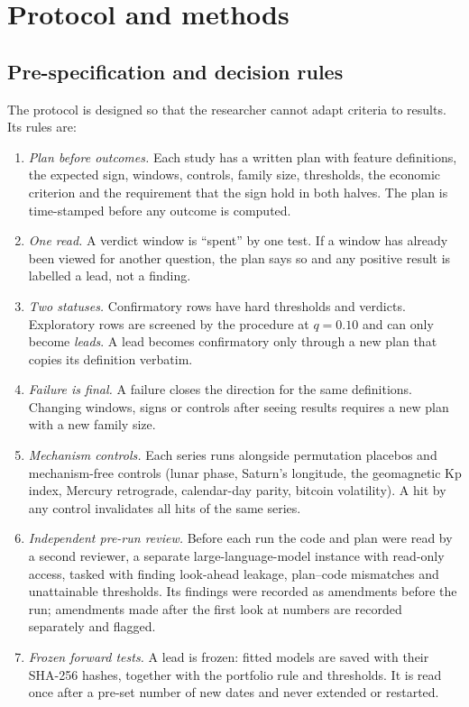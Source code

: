 \section{Protocol and methods}\label{sec:method}

\subsection{Pre-specification and decision rules}\label{sec:protocol}

The protocol is designed so that the researcher cannot adapt criteria to results. Its rules are:
\begin{enumerate}[label=(\roman*)]
\item \emph{Plan before outcomes.} Each study has a written plan with feature definitions, the expected sign, windows, controls, family size, thresholds, the economic criterion and the requirement that the sign hold in both halves. The plan is time-stamped before any outcome is computed.
\item \emph{One read.} A verdict window is ``spent'' by one test. If a window has already been viewed for another question, the plan says so and any positive result is labelled a lead, not a finding.
\item \emph{Two statuses.} Confirmatory rows have hard thresholds and verdicts. Exploratory rows are screened by the \citet{benjamini1995} procedure at $q=0.10$ and can only become \emph{leads}. A lead becomes confirmatory only through a new plan that copies its definition verbatim.
\item \emph{Failure is final.} A failure closes the direction for the same definitions. Changing windows, signs or controls after seeing results requires a new plan with a new family size.
\item \emph{Mechanism controls.} Each series runs alongside permutation placebos and mechanism-free controls (lunar phase, Saturn's longitude, the geomagnetic Kp index, Mercury retrograde, calendar-day parity, bitcoin volatility). A hit by any control invalidates all hits of the same series.
\item \emph{Independent pre-run review.} Before each run the code and plan were read by a second reviewer, a separate large-language-model instance with read-only access, tasked with finding look-ahead leakage, plan--code mismatches and unattainable thresholds. Its findings were recorded as amendments before the run; amendments made after the first look at numbers are recorded separately and flagged.
\item \emph{Frozen forward tests.} A lead is frozen: fitted models are saved with their SHA-256 hashes, together with the portfolio rule and thresholds. It is read once after a pre-set number of new dates and never extended or restarted.

\end{enumerate}
